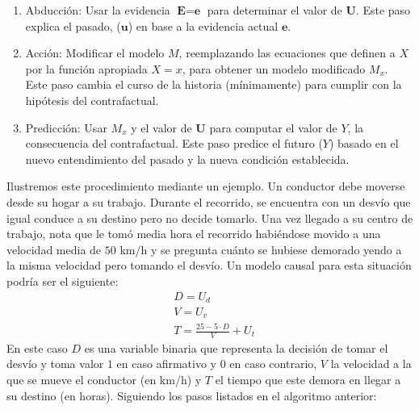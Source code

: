 \begin{enumerate}
	\item Abducción: Usar la evidencia $\textbf{E}=\textbf{e}$  para determinar el valor de $\textbf{U}$. Este paso explica el pasado, ($\textbf{u}$) en base a la evidencia actual $\textbf{e}$.
	\item Acción: Modificar el modelo $M$, reemplazando las ecuaciones que definen a $X$ por la función apropiada $X=x$, para obtener un modelo modificado $M_x$. Este paso cambia el curso de la historia (mínimamente) para cumplir con la hipótesis del contrafactual.
	\item Predicción: Usar $M_x$ y el valor de $\textbf{U}$ para computar el valor de $Y$, la consecuencia del contrafactual. Este paso predice el futuro ($Y$) basado en el nuevo entendimiento del pasado y la nueva condición establecida.
\end{enumerate}

Ilustremos este procedimiento mediante un ejemplo. Un conductor debe moverse desde su hogar a su trabajo. Durante el recorrido, se encuentra con un desvío que igual conduce a su destino pero no decide tomarlo. Una vez llegado a su centro de trabajo, nota que le tomó media hora el recorrido habiéndose movido a una velocidad media de $50$ km/h y se pregunta cuánto se hubiese demorado yendo a la misma velocidad pero tomando el desvío. Un modelo causal para esta situación podría ser el siguiente:		
\begin{align*}
	&D=U_d\\
	&V=U_v\\
	&T=	\frac{25 - 5 \cdot D}{V} + U_t
\end{align*}
En este caso $D$ es una variable binaria que representa la decisión de tomar el desvío y toma valor $1$ en caso afirmativo y $0$ en caso contrario, $V$ la velocidad a la que se mueve el conductor (en km/h) y $T$ el tiempo que este demora en llegar a su destino (en horas). Siguiendo los pasos listados en el algoritmo anterior:

